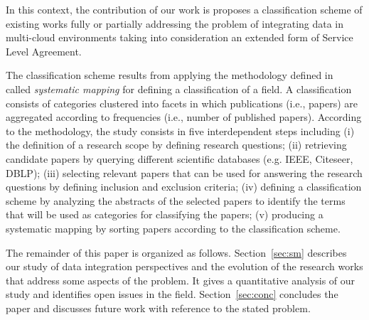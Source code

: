 In this context, the contribution of our work is
proposes a classification scheme of existing works fully or partially addressing
the problem of integrating data in multi-cloud environments taking into
consideration an extended form of Service Level Agreement. 
 


The classification scheme results from  applying the  methodology defined
in~\cite{SM:Petersen:2008} called  \textit{systematic mapping}  for defining a
classification of a field. A classification consists of categories clustered
into facets in which publications (i.e., papers) are aggregated according to
frequencies (i.e., number of published papers). According to the methodology,
the study consists in  five interdependent steps including (i) the definition of
a research scope by defining research questions; (ii) retrieving candidate
papers by querying different scientific databases (e.g. IEEE, Citeseer, DBLP);
(iii) selecting relevant papers that can be used for answering the research
questions by defining inclusion and exclusion criteria; (iv) defining a
classification scheme by analyzing the abstracts of the selected papers to
identify the terms that will be used as categories for classifying the papers;
(v) producing a systematic mapping by sorting papers according to the
classification scheme.              


The remainder of this paper is organized as follows. Section~\ref{sec:sm}
describes our study of data integration perspectives and the evolution of the
research works that address some aspects of the problem. It gives a quantitative
analysis of our study and identifies open issues in the field.
Section~\ref{sec:conc} concludes the paper and discusses future work with
reference to the stated problem.



